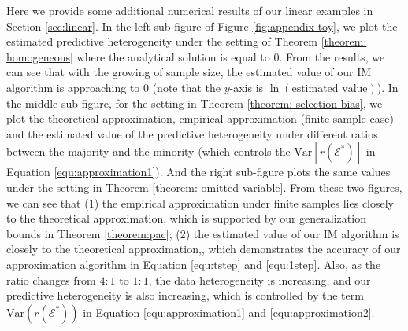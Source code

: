 Here we provide some additional numerical results of our linear examples in Section \ref{sec:linear}.
In the left sub-figure of Figure \ref{fig:appendix-toy}, we plot the estimated predictive heterogeneity under the setting of Theorem \ref{theorem: homogeneous} where the analytical solution is equal to 0.
From the results, we can see that with the growing of sample size, the estimated value of our IM algorithm is approaching to 0 (note that the $y$-axis is $\ln(\text{estimated value})$).
In the middle sub-figure, for the setting in Theorem \ref{theorem: selection-bias}, we plot the theoretical approximation, empirical approximation (finite sample case) and the estimated value of the predictive heterogeneity under different ratios between the majority and the minority (which controls the $\text{Var}[r(\mathcal{E}^*)]$ in Equation \ref{equ:approximation1}).
And the right sub-figure plots the same values under the setting in Theorem \ref{theorem: omitted variable}.
From these two figures, we can see that (1) the empirical approximation under finite samples lies closely to the theoretical approximation, which is supported by our generalization bounds in Theorem \ref{theorem:pac}; (2) the estimated value of our IM algorithm is closely to the theoretical approximation,, which demonstrates the accuracy of our approximation algorithm in Equation \ref{equ:tstep} and \ref{equ:1step}. 
Also, as the ratio changes from $4:1$ to $1:1$, the data heterogeneity is increasing, and our predictive heterogeneity is also increasing, which is controlled by the term $\text{Var}(r(\mathcal{E}^*))$ in Equation \ref{equ:approximation1} and \ref{equ:approximation2}.






